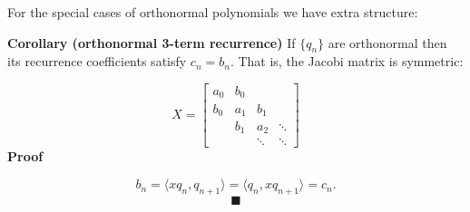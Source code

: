 \documentclass[12pt,a4paper]{article}
\begin{document}
For the special cases of orthonormal polynomials we have extra structure:

\textbf{Corollary (orthonormal 3-term recurrence)} If $\{q_n\}$ are orthonormal then its recurrence coefficients satisfy $c_n = b_n$. That is, the Jacobi matrix is symmetric:

\[
X = \begin{bmatrix} a_0 & b_0 \\
                                                        b_0 & a_1 & b_1\\
                                                        & b_1 & a_2 & \ensuremath{\ddots} \\
                                                        && \ensuremath{\ddots} & \ensuremath{\ddots}
                                                        \end{bmatrix}
\]
\textbf{Proof}

\[
b_n = \ensuremath{\langle}x q_n, q_{n+1}\ensuremath{\rangle} = \ensuremath{\langle}q_n, x q_{n+1}\ensuremath{\rangle} = c_{n}.
\]
\[
\blacksquare
\]
\end{document}
